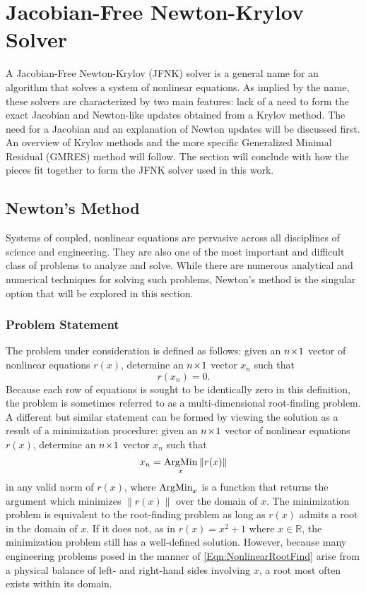 \documentclass[12pt]{UWMadThesis}
\begin{document}
\chapter[JFNK Solver]{Jacobian-Free Newton-Krylov Solver}

A Jacobian-Free Newton-Krylov (JFNK) solver is a general name for an algorithm that solves a system of nonlinear equations.
As implied by the name, these solvers are characterized by two main features: lack of a need to form the exact Jacobian and Newton-like updates obtained from a Krylov method.
The need for a Jacobian and an explanation of Newton updates will be discussed first.
An overview of Krylov methods and the more specific Generalized Minimal Residual (GMRES) method will follow.
The section will conclude with how the pieces fit together to form the JFNK solver used in this work.





\section{Newton's Method}
Systems of coupled, nonlinear equations are pervasive across all disciplines of science and engineering.
They are also one of the most important and difficult class of problems to analyze and solve.
While there are numerous analytical and numerical techniques for solving such problems, Newton's method is the singular option that will be explored in this section.

\subsection{Problem Statement}
The problem under consideration is defined as follows: given an $n \!\times\! 1$ vector of nonlinear equations $r(x)$, determine an $n \!\times\! 1$ vector $x_n$ such that
\begin{equation}
    r(x_n) = 0.
    \label{Eqn:NonlinearRootFind}
\end{equation}
Because each row of equations is sought to be identically zero in this definition, the problem is sometimes referred to as a multi-dimensional root-finding problem.
A different but similar statement can be formed by viewing the solution as a result of a minimization procedure: given an $n \!\times\! 1$ vector of nonlinear equations $r(x)$, determine an $n \!\times\! 1$ vector $x_n$ such that
\begin{equation}
    x_n = \operatorname*{ArgMin}_{x} \|r(x)\|
    \label{Eqn:NonlinearMinimize}
\end{equation}
in any valid norm of $r(x)$, where $\operatorname*{ArgMin}_x$ is a function that returns the argument which minimizes $\|r(x)\|$ over the domain of $x$.
The minimization problem is equivalent to the root-finding problem as long as $r(x)$ admits a root in the domain of $x$.
If it does not, as in $r(x) = x^2+1$ where $x \in \mathbb{R}$, the minimization problem still has a well-defined solution.
However, because many engineering problems posed in the manner of \cref{Eqn:NonlinearRootFind} arise from a physical balance of left- and right-hand sides involving $x$, a root most often exists within its domain.
\end{document}
